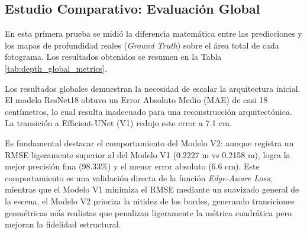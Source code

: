 \documentclass[12pt, a4, twoside, openany]{report}
\begin{document}
\subsection{Estudio Comparativo: Evaluación Global}

En esta primera prueba se midió la diferencia matemática entre las predicciones y los mapas de profundidad reales (\textit{Ground Truth}) sobre el área total de cada fotograma. Los resultados obtenidos se resumen en la Tabla \ref{tab:depth_global_metrics}.

\begin{table}[H]
\centering
\caption{Rendimiento global comparativo de los modelos de profundidad.}
\label{tab:depth_global_metrics}
\end{table}

Los resultados globales demuestran la necesidad de escalar la arquitectura inicial. El modelo ResNet18 obtuvo un Error Absoluto Medio (MAE) de casi 18 centímetros, lo cual resulta inadecuado para una reconstrucción arquitectónica. La transición a Efficient-UNet (V1) redujo este error a 7.1 cm. 

Es fundamental destacar el comportamiento del Modelo V2: aunque registra un RMSE ligeramente superior al del Modelo V1 (0.2227 m vs 0.2158 m), logra la mejor precisión fina (98.33\%) y el menor error absoluto (6.6 cm). Este comportamiento es una validación directa de la función \textit{Edge-Aware Loss}; mientras que el Modelo V1 minimiza el RMSE mediante un suavizado general de la escena, el Modelo V2 prioriza la nitidez de los bordes, generando transiciones geométricas más realistas que penalizan ligeramente la métrica cuadrática pero mejoran la fidelidad estructural.
\end{document}
